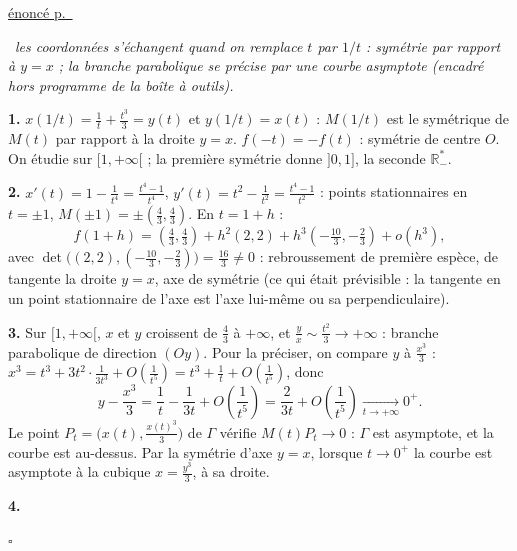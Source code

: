 \documentclass[a4paper,11pt]{article}
\numberwithin{equation}{section}
\numberwithin{figure}{section}
\numberwithin{table}{section}
\theoremstyle{enonce}
\theoremstyle{exemple}
\theoremstyle{remarque}
\newenvironment{corrige}[1]{%
  \par\needspace{6\baselineskip}\vspace{1em}\phantomsection\label{c:#1}%
  \noindent{\sffamily\bfseries\color{Bleu}Exercice~\ref{e:#1}}\quad
  {\scriptsize\sffamily\hyperref[e:#1]{\color{Gris}énoncé p.~\pageref{e:#1}}}\par\nobreak\vspace{0.2em}}%
  {\hfill\textcolor{BleuClair}{$\square$}\par}
\newcommand{\R}{\mathbb{R}}
\newcommand{\demarche}[1]{\noindent{\sffamily\bfseries\small\color{BleuMoyen}Démarche.}\ \textit{#1}\par\smallskip}
\begin{document}
\begin{corrige}{cub-asy}
\demarche{les coordonnées s'échangent quand on remplace $t$ par $1/t$ : symétrie par rapport à $y=x$ ; la branche parabolique se précise par une courbe asymptote (encadré hors programme de la boîte à outils).}
\textbf{1.} $x(1/t)=\frac1t+\frac{t^3}3=y(t)$ et $y(1/t)=x(t)$ : $M(1/t)$ est le symétrique de $M(t)$ par rapport à la
droite $y=x$. $f(-t)=-f(t)$ : symétrie de centre $O$. On étudie sur $[1,+\infty[$ ; la première symétrie donne $]0,1]$, la
seconde $\R_-^*$.

\textbf{2.} $x'(t)=1-\frac1{t^4}=\frac{t^4-1}{t^4}$, $y'(t)=t^2-\frac1{t^2}=\frac{t^4-1}{t^2}$ : points stationnaires en
$t=\pm1$, $M(\pm1)=\pm\left(\frac43,\frac43\right)$. En $t=1+h$ :
\[f(1+h)=\left(\tfrac43,\tfrac43\right)+h^2(2,2)+h^3\left(-\tfrac{10}3,-\tfrac23\right)+o(h^3),\]
avec $\det\big((2,2),(-\frac{10}3,-\frac23)\big)=\frac{16}3\neq0$ : rebroussement de première espèce, de tangente la droite
$y=x$, axe de symétrie (ce qui était prévisible : la tangente en un point stationnaire de l'axe est l'axe lui-même ou sa
perpendiculaire).

\textbf{3.} Sur $[1,+\infty[$, $x$ et $y$ croissent de $\frac43$ à $+\infty$, et $\frac yx\sim\frac{t^2}3\to+\infty$ :
branche parabolique de direction $(Oy)$. Pour la préciser, on compare $y$ à $\frac{x^3}3$ :
$x^3=t^3+3t^2\cdot\frac1{3t^3}+O\!\left(\frac1{t^5}\right)=t^3+\frac1t+O\!\left(\frac1{t^5}\right)$, donc
\[y-\frac{x^3}3=\frac1t-\frac1{3t}+O\!\left(\frac1{t^5}\right)=\frac2{3t}+O\!\left(\frac1{t^5}\right)\xrightarrow[t\to+\infty]{}0^+.\]
Le point $P_t=\big(x(t),\frac{x(t)^3}3\big)$ de $\Gamma$ vérifie $M(t)P_t\to0$ : $\Gamma$ est asymptote, et la courbe est
au-dessus. Par la symétrie d'axe $y=x$, lorsque $t\to0^+$ la courbe est asymptote à la cubique $x=\frac{y^3}3$, à sa droite.

\textbf{4.}
\begin{center}
\end{center}
\end{corrige}
\end{document}
